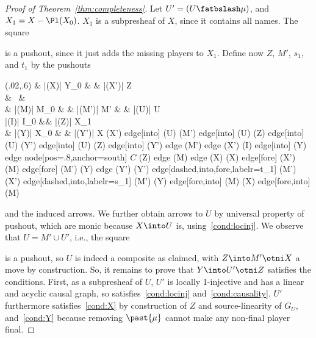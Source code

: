 \documentclass{LMCS}
\theoremstyle{plain}\newtheorem{satz}[thm]{Satz}
\begin{document}
\begin{proof}[Proof of Theorem~\ref{thm:completeness}]
  Let $U' = (U \fatbslash \mu)$, and $X_1 = X - \Pl(X_0)$. $X_1$ is a
  subpresheaf of $X$, since it contains all names. The square
  \begin{center}
  \end{center}
  is a pushout, since it just adds the missing players to $X_1$. 
  Define now $Z$, $M'$, $s_1$, and $t_1$ by the pushouts
  \begin{center}
    \Diag(.02,.6){   }{\& |(X)| Y_0 \& \& |(X')| {Z} \\
      \& \ \& \\
      \& |(M)| M_0 \& \& |(M')| M'  \& \& |(U)| U \\
      |(I)| I_0 \&\& |(Z)| X_1 \\
      \& |(Y)| X_0 \& \& |(Y')| X }{(X') edge[into] (U) (M') edge[into] (U) (Z)  edge[into] (U) (Y') edge[into] (U) (Z) edge[into] (Y') edge (M') edge (X') (I) edge[into] (Y) edge node[pos=.8,anchor=south] {$C$} (Z) edge (M) edge (X) (X) edge[fore] (X') (M) edge[fore] (M') (Y) edge (Y') (Y') edge[dashed,into,fore,labelr={t_1}] (M') (X') edge[dashed,into,labelr={s_1}] (M') (Y) edge[fore,into] (M) (X) edge[fore,into] (M) }
  \end{center}
  and the induced arrows.  We further obtain arrows to $U$ by
  universal property of pushout, which are monic because $X \into U$
  is, using~\ref{cond:locinj}. We observe that $U = M' \cup U'$, i.e.,
  the square
  \begin{center}
  \end{center}
  is a pushout, so $U$ is indeed a composite as claimed, with $Z \into
  M' \otni X$ a move by construction. So, it remains to
  prove that $Y \into U' \otni Z$ satisfies the conditions. First, as
  a subpresheaf of $U$, $U'$ is locally 1-injective and has a linear
  and acyclic causal graph, so satisfies~\ref{cond:locinj}
  and~\ref{cond:causality}. $U'$ furthermore
  satisfies~\ref{cond:X} by construction of $Z$ and source-linearity
  of $G_U$, and~\ref{cond:Y} because removing $\past{\mu}$ cannot
  make any non-final player final.
\end{proof}
\end{document}
